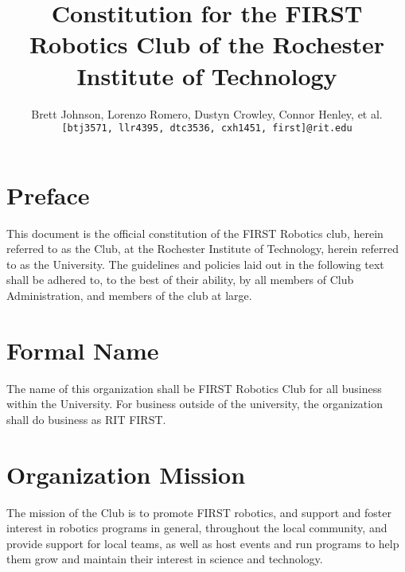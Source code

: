 \documentclass[english,11pt]{article}
\renewcommand{\footrulewidth}{1pt} %
\begin{document}
\title{Constitution for the FIRST Robotics Club of the Rochester Institute of Technology}
\author{
    Brett Johnson, Lorenzo Romero, Dustyn Crowley, Connor Henley, et al.  %
    \\    
    \texttt{[btj3571, llr4395, dtc3536, cxh1451, first]@rit.edu}
}
\date{} %

\fancypagestyle{plain}{
    \fancyhf{}
    \rfoot{\today}
    \renewcommand{\footrulewidth}{0pt} %
}

\maketitle
\newpage %


\section*{Preface}
This document is the official constitution of the FIRST Robotics club, herein referred to as the Club, at the Rochester Institute of Technology, herein referred to as the University.
The guidelines and policies laid out in the following text shall be adhered to, to the best of their ability, by all members of Club Administration, and members of the club at large.

\section{Formal Name}
The name of this organization shall be FIRST Robotics Club for all business within the University. 
For business outside of the university, the organization shall do business as RIT FIRST.

\section{Organization Mission}
The mission of the Club is to promote FIRST robotics, and support and foster interest in robotics programs in general, throughout the local community, and provide support for local teams, as well as host events and run programs to help them grow and maintain their interest in science and technology.
\end{document}
